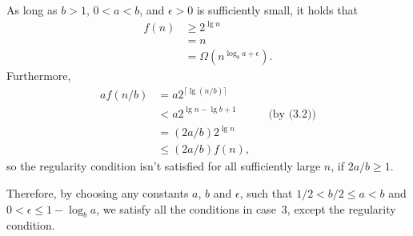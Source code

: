 As long as $b>1$, $0<a<b$, and $\epsilon>0$ is sufficiently small, it holds that
\begin{align*}
    f(n) &\ge 2^{\lg n} \\
    &= n \\
    &= \Omega(n^{\log_ba+\epsilon}).
\end{align*}
Furthermore,
\begin{align*}
    af(n/b) &= a2^{\lceil\lg(n/b)\rceil} \\
    &< a2^{\lg n-\lg b+1} && \text{(by (3.2))} \\
    &= (2a/b)2^{\lg n} \\
    &\le (2a/b)f(n),
\end{align*}
so the regularity condition isn't satisfied for all sufficiently large $n$, if $2a/b\ge1$.

Therefore, by choosing any constants $a$, $b$ and $\epsilon$, such that $1/2<b/2\le a<b$ and $0<\epsilon\le1-\log_ba$, we satisfy all the conditions in case~3, except the regularity condition.
